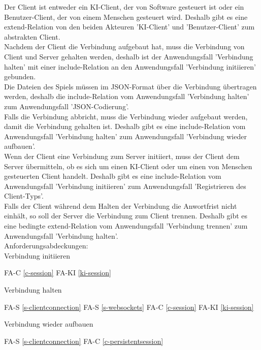 Der Client ist entweder ein KI-Client, der von Software gesteuert ist oder ein Benutzer-Client, der von einem Menschen gesteuert wird. Deshalb gibt es eine extend-Relation von den beiden Akteuren 'KI-Client' und 'Benutzer-Client' zum abstrakten Client. \\
Nachdem der Client die Verbindung aufgebaut hat, muss die Verbindung von Client und Server gehalten werden, deshalb ist der Anwendungsfall 'Verbindung halten' mit einer include-Relation an den Anwendungsfall 'Verbindung initiieren' gebunden. \\
Die Dateien des Spiels müssen im JSON-Format über die Verbindung übertragen werden, deshalb die include-Relation vom Anwendungsfall 'Verbindung halten' zum Anwendungsfall 'JSON-Codierung'. \\
Falls die Verbindung abbricht, muss die Verbindung wieder aufgebaut werden, damit die Verbindung gehalten ist. Deshalb gibt es eine include-Relation vom Anwendungsfall 'Verbindung halten' zum Anwendungsfall 'Verbindung wieder aufbauen'. \\
Wenn der Client eine Verbindung zum Server initiiert, muss der Client dem Server übermitteln, ob es sich um einen KI-Client oder um einen von Menschen gesteuerten Client handelt. Deshalb gibt es eine include-Relation vom Anwendungsfall 'Verbindung initiieren' zum Anwendungsfall 'Registrieren des Client-Typs'. \\
Falls der Client während dem Halten der Verbindung die Anwortfrist nicht einhält, so soll der Server die Verbindung zum Client trennen. Deshalb gibt es eine bedingte extend-Relation vom Anwendungsfall 'Verbindung trennen' zum Anwendungsfall 'Verbindung halten'. \\


Anforderungsabdeckungen:\\

Verbindung initiieren

FA-C \ref{c-session} %
FA-KI \ref{ki-session} %

Verbindung halten

FA-S \ref{s-clientconnection} %
FA-S \ref{s-websockets} %
FA-C \ref{c-session} %
FA-KI \ref{ki-session} %

Verbindung wieder aufbauen

FA-S \ref{s-clientconnection} %
FA-C \ref{c-persistentsession} %


